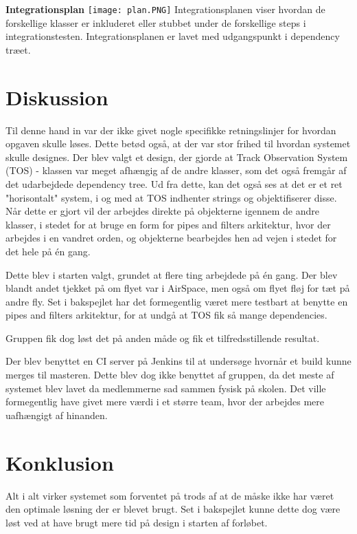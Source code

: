 \textbf{Integrationsplan} \newline
\texttt{[image: plan.PNG]} \newline
Integrationsplanen viser hvordan de forskellige klasser er inkluderet eller stubbet under de forskellige steps i integrationstesten. Integrationsplanen er lavet med udgangspunkt i dependency træet.

\section{Diskussion}
Til denne hand in var der ikke givet nogle specifikke retningslinjer for hvordan opgaven skulle løses. Dette betød også, at der var stor frihed til hvordan systemet skulle designes. \tabularnewline
Der blev valgt et design, der gjorde at Track Observation System (TOS) - klassen var meget afhængig af de andre klasser, som det også fremgår af det udarbejdede dependency tree. 
Ud fra dette, kan det også ses at det er et ret "horisontalt" system, i og med at TOS indhenter strings og objektifiserer disse. 
Når dette er gjort vil der arbejdes direkte på objekterne igennem de andre klasser, i stedet for at bruge en form for pipes and filters arkitektur, hvor der arbejdes i en vandret orden, og objekterne bearbejdes hen ad vejen i stedet for det hele på én gang. 

Dette blev i starten valgt, grundet at flere ting arbejdede på én gang. Der blev blandt andet tjekket på om flyet var i AirSpace, men også om flyet fløj for tæt på andre fly. \tabularnewline
Set i bakspejlet har det formegentlig været mere testbart at benytte en pipes and filters arkitektur, for at undgå at TOS fik så mange dependencies.

Gruppen fik dog løst det på anden måde og fik et tilfredsstillende resultat.


Der blev benyttet en CI server på Jenkins til at undersøge hvornår et build kunne merges til masteren. \tabularnewline
Dette blev dog ikke benyttet af gruppen, da det meste af systemet blev lavet da medlemmerne sad sammen fysisk på skolen.\tabularnewline
Det ville formegentlig have givet mere værdi i et større team, hvor der arbejdes mere uafhængigt af hinanden. \newline

\section{Konklusion}
Alt i alt virker systemet som forventet på trods af at de måske ikke har været den optimale løsning der er blevet brugt. \tabularnewline
Set i bakspejlet kunne dette dog være løst ved at have brugt mere tid på design i starten af forløbet. 